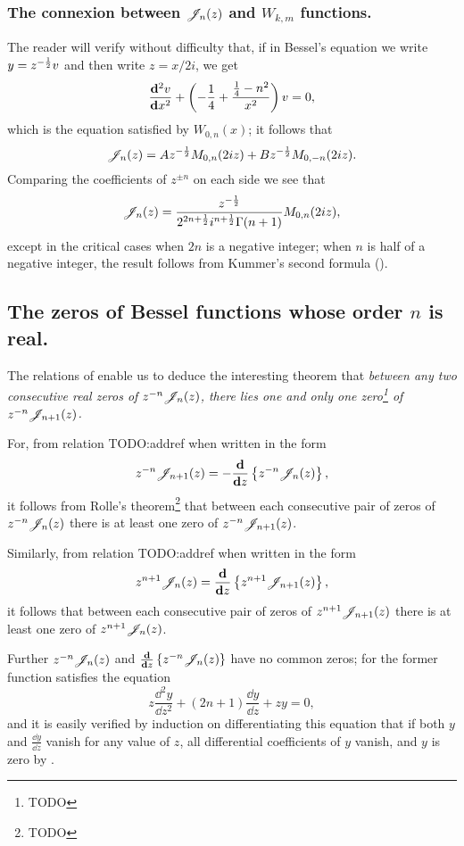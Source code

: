 \documentclass{book}
\begin{document}
\subsubsection{The connexion between $\mathscr{J}_n(z)$ and $W_{k,m}$
  functions.}
The reader will verify without difficulty that, if in Bessel's
equation we write $y = z^{-\frac{1}{2}} v$ and then write $z = x/2i$, we get
$$
\frac{\mathbf{d}^2 v}{\mathbf{d} x^2}
+
\left(  -\frac{1}{4} + \frac{\frac{1}{4} - n^2}{x^2}   \right) v
=
0,
$$
which is the equation satisfied by $W_{0,n}(x)$; it follows that
$$
\mathscr{J}_n(z) = A z^{-\frac{1}{2}} M_{0,n}(2iz) + B z^{-\frac{1}{2}} M_{0,-n}(2iz).
$$
Comparing the coefficients of $z^{\pm n}$ on each side we see that
$$
\mathscr{J}_n(z) = \frac{z^{-\frac{1}{2}}}{2^{2n+\frac{1}{2}} i^{n+\frac{1}{2}} \Gamma(n+1)} M_{0,n}(2iz),
$$
% 
% 
except in the critical cases when $2n$ is a negative integer; 
when $n$ is half of a negative integer, the result follows from
Kummer's second formula ().
\subsection{The zeros of Bessel functions whose order $n$ is real.}
The relations of  enable us to deduce the
interesting theorem that \emph{between any two consecutive real zeros
  of $z^{-n}\mathscr{J}_n(z)$, there lies one and only one zero\footnote{TODO}
  of $z^{-n}\mathscr{J}_{n+1}(z)$.}

For, from relation TODO:addref when written in the form
$$
z^{-n} \mathscr{J}_{n+1}(z) 
= 
- \frac{\mathbf{d}}{\mathbf{d} z} \left\{  z^{-n} \mathscr{J}_n(z)  \right\},
$$
it follows from Rolle's theorem\footnote{TODO} that between each
consecutive pair of zeros of $z^{-n}\mathscr{J}_n(z)$ there is at least one zero
of $z^{-n} \mathscr{J}_{n+1}(z)$.

Similarly, from relation TODO:addref when written in the form
$$
z^{n+1} \mathscr{J}_n(z) 
= 
\frac{\mathbf{d}}{\mathbf{d} z} \left\{  z^{n+1} \mathscr{J}_{n+1}(z)  \right\},
$$
it follows that between each consecutive pair of zeros of 
$z^{n+1}\mathscr{J}_{n+1}(z)$ there is at least one zero of 
$z^{n+1}\mathscr{J}_n(z)$.

Further $z^{-n}\mathscr{J}_n(z)$ and 
$\frac{\mathbf{d}}{\mathbf{d} z} \left\{  z^{-n} \mathscr{J}_n(z)   \right\}$ have no common zeros; for
the former function satisfies the equation
$$
z \frac{\dd^2 y}{\dd z^2} + (2n+1) \frac{\dd y}{\dd z} + zy = 0,
$$
and it is easily verified by induction on differentiating this
equation that if both $y$ and $\frac{\dd y}{\dd z}$ vanish for any value of
$z$, all differential coefficients of $y$ vanish, and $y$ is zero by 
.
\end{document}
